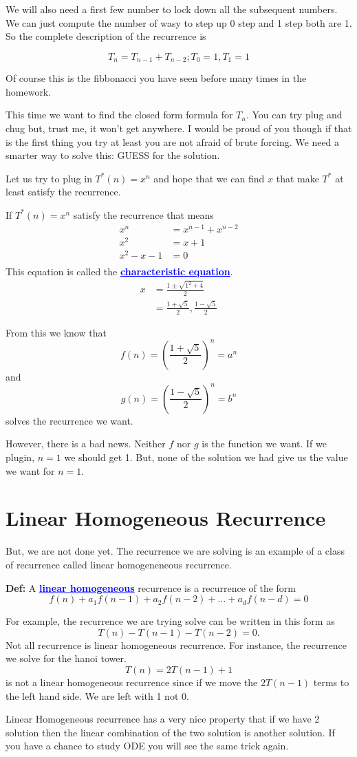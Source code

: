 \documentclass[a4paper, 12pt]{article}
\newcommand{\definition}{\vspace{1em}\noindent\textbf{Def:} }
\newcommand{\kwd}[1]{\textcolor{blue}{\textbf{\underline{#1}}}}
\begin{document}
\begin{multicols}{2}
We will also need a first few number to lock down all the subsequent numbers. We can just compute the number of wasy to step up 0 step and 1 step both are 1. So the complete description of the recurrence is

\[
	T_n = T_{n-1} + T_{n-2}; T_0 =1, T_1=1
\]

Of course this is the fibbonacci you have seen before many times in the homework.

This time we want to find the closed form formula for $T_n$. You can try plug and chug but, trust me, it won't get anywhere. I would be proud of you though if that is the first thing you try at least you are not afraid of brute forcing. We need a smarter way to solve this: GUESS for the solution.

Let us try to plug in $T^*(n) = x^n$ and hope that we can find $x$ that make $T^*$ at least satisfy the recurrence.

If $T^*(n) = x^n$ satisfy the recurrence that means
\begin{align*}
	x^n &= x^{n-1} + x^{n-2}\\
	x^2 &= x + 1\\
	x^2 -x -1 &= 0\\
\end{align*}
This equation is called the \kwd{characteristic equation}.
\begin{align*}
	x &= \frac{1 \pm \sqrt{1^2 +4}}{2}\\
	&= \frac{1 + \sqrt{5}}{2}, \frac{1 - \sqrt{5}}{2} 
\end{align*}

From this we know that
\[
	f(n) = \left(\frac{1 + \sqrt{5}}{2}\right)^n = a^n
\]
and 
\[
	g(n) = \left(\frac{1 - \sqrt{5}}{2}\right)^n = b^n
\]
solves the recurrence we want.

However, there is a bad news. Neither $f$ nor $g$ is the function we want. If we plugin, $n=1$ we should get 1. But, none of the solution we had give us the value we want for $n=1$.

\section*{Linear Homogeneous Recurrence}

But, we are not done yet. The recurrence we are solving is an example of a class of  recurrence called linear homogeneneous recurrence.

\definition A \kwd{linear homogeneous} recurrence is a recurrence of the form
\[
	f(n) + a_1 f(n-1) + a_2f(n-2) + \ldots +a_d f(n-d) = 0
\]

For example, the recurrence we are trying solve can be written in this form as
\[
	T(n) - T(n-1) - T(n-2) = 0.
\]
Not all recurrence is linear homogeneous recurrence. For instance, the recurrence we solve for the hanoi tower.
\[
	T(n) = 2T(n-1) + 1
\]
is not a linear homogeneous recurrence since if we move the $2T(n-1)$ terms to the left hand side. We are left with 1 not 0.

Linear Homogeneous recurrence has a very nice property that if we have 2 solution then the linear combination of the two solution is another solution. If you have a chance to study ODE you will see the same trick again.
\end{multicols} 
\end{document}
